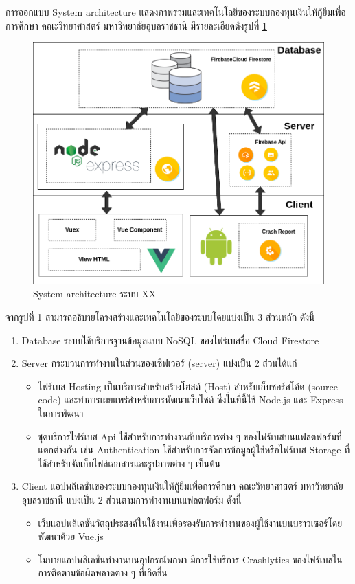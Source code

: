     การออกแบบ System architecture แสดงภาพรวมและเทคโนโลยีของระบบกองทุนเงินให้กู้ยืมเพื่อการศึกษา คณะวิทยาศาสตร์ มหาวิทยาลัยอุบลราชธานี มีรายละเอียดดังรูปที่ \ref{Fig:architecture}
   	\begin{figure}[H]
   		\centering
   		\includegraphics[width=\textwidth]{Figures/3/architecture/architecture}
   		\caption{System architecture ระบบ XX}
   		\label{Fig:architecture}
   	\end{figure}
   
   จากรูปที่ \ref{Fig:architecture} สามารถอธิบายโครงสร้างและเทคโนโลยีของระบบโดยแบ่งเป็น 3 ส่วนหลัก ดังนี้
   \begin{enumerate}
   	\item Database
   	 ระบบใช้บริการฐานข้อมูลแบบ NoSQL ของไฟร์เบสชื่อ Cloud Firestore
	  \item Server
	   กระบวนการทำงานในส่วนของเซิฟเวอร์ (server) แบ่งเป็น 2 ส่วนได้แก่
	   \begin{itemize}
	   	\item ไฟร์เบส Hosting เป็นบริการสำหรับสร้างโฮสต์ (Host) สำหรับเก็บซอร์สโค้ด (source code) และทำการเผยแพร่สำหรับการพัฒนาเว็บไซต์ ซึ่งในที่นี้ใช้ Node.js และ Express ในการพัฒนา
	   	\item ชุดบริการไฟร์เบส Api ใช้สำหรับการทำงานกับบริการต่าง ๆ ของไฟร์เบสบนแฟลตฟอร์มที่แตกต่างกัน เช่น Authentication ใช้สำหรับการจัดการข้อมูลผู้ใช้หรือไฟร์เบส Storage ที่ใช้สำหรับจัดเก็บไฟล์เอกสารและรูปภาพต่าง ๆ เป็นต้น
	   \end{itemize}
	   \item Client
	    แอปพลิเคชันของระบบกองทุนเงินให้กู้ยืมเพื่อการศึกษา คณะวิทยาศาสตร์ มหาวิทยาลัยอุบลราชธานี แบ่งเป็น 2 ส่วนตามการทำงานบนแฟลตฟอร์ม ดังนี้
	    \begin{itemize}
	    	\item เว็บแอปพลิเคชันวัตถุประสงค์ในใช้งานเพื่อรองรับการทำงานของผู้ใช้งานบนบราวเซอร์โดยพัฒนาด้วย Vue.js
	    	\item โมบายแอปพลิเคชันทำงานบนอุปกรณ์พกพา มีการใช้บริการ Crashlytics ของไฟร์เบสในการติดตามข้อผิดพลาดต่าง ๆ ที่เกิดขึ้น
	    \end{itemize}
   \end{enumerate}

